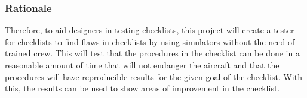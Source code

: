 \documentclass[a4paper]{article}
\newcommand{\lfcomment}[1]{\textcolor{blue}{\textbf{LF}:~#1}}
\renewcommand{\lfcomment}[1]{\relax}
\begin{document}
\subsubsection*{Rationale}

Therefore, to aid designers in testing checklists, this project 
will create a tester for checklists to find flaws in checklists 
by using simulators without the need of trained crew. This will 
test that the procedures in the checklist can be done in a reasonable
amount of time that will not endanger the aircraft and that the procedures 
will have reproducible results for the given goal of the checklist.
With this, the results can be used to show areas of improvement in 
the checklist.

\lfcomment{On CL book, Ch1 is about nature of where CL work best; Ch2 explains what a CL is and isn't; Ch3 you can ignore, it talks about checklist for unknown/unexpected scenarios (advanced CL) in building; Ch4 he discussed CL with chefs; Ch5 talks about CL failures and why; \textbf{Ch6 is about Boeing's CL ``factory''}; Ch7 and 8 are about applying the CL he came up with, here you get the examples of test/baseline criteria for CL; Ch9 he explains it in his own practice (this is daunting read)!.}
\end{document}
